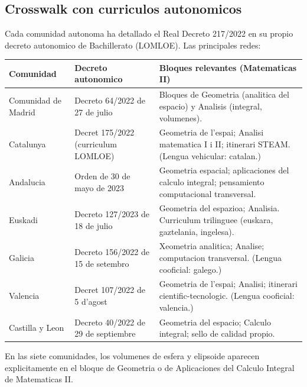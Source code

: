 \documentclass[12pt,a4paper]{scrartcl}
\begin{document}
\subsection{Crosswalk con curriculos autonomicos}

Cada comunidad autonoma ha detallado el Real Decreto 217/2022 en su propio decreto autonomico de Bachillerato (LOMLOE). Las principales redes:

\begin{center}
\small
\begin{tabularx}{\textwidth}{@{}p{}p{}X@{}}
\toprule
\textbf{Comunidad} & \textbf{Decreto autonomico} & \textbf{Bloques relevantes (Matematicas II)} \\
\midrule
Comunidad de Madrid & Decreto 64/2022 de 27 de julio & Bloques de Geometria (analitica del espacio) y Analisis (integral, volumenes). \\
\addlinespace[3pt]
Catalunya & Decret 175/2022 (curriculum LOMLOE) & Geometria de l'espai; Analisi matematica I i II; itinerari STEAM. (Lengua vehicular: catalan.) \\
\addlinespace[3pt]
Andalucia & Orden de 30 de mayo de 2023 & Geometria espacial; aplicaciones del calculo integral; pensamiento computacional transversal. \\
\addlinespace[3pt]
Euskadi & Decreto 127/2023 de 18 de julio & Geometria del espazioa; Analisia. Curriculum trilinguee (euskara, gaztelania, ingelesa). \\
\addlinespace[3pt]
Galicia & Decreto 156/2022 de 15 de setembro & Xeometria analitica; Analise; computacion transversal. (Lengua cooficial: galego.) \\
\addlinespace[3pt]
Valencia & Decret 107/2022 de 5 d'agost & Geometria de l'espai; Analisi; itinerari cientific-tecnologic. (Lengua cooficial: valencia.) \\
\addlinespace[3pt]
Castilla y Leon & Decreto 40/2022 de 29 de septiembre & Geometria del espacio; Calculo integral; sello de calidad propio. \\
\bottomrule
\end{tabularx}
\end{center}

En las siete comunidades, los volumenes de esfera y elipsoide aparecen explicitamente en el bloque de Geometria o de Aplicaciones del Calculo Integral de Matematicas II.
\end{document}
